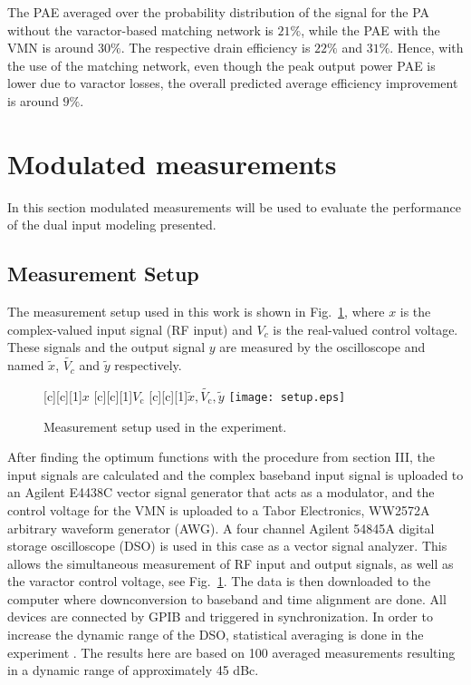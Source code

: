 \documentclass[10pt,journal]{IEEEtran}
\begin{document}
The PAE averaged over the probability distribution of the signal for the PA without the varactor-based matching network is $21\%$, while the PAE with the
VMN is around $30\%$. The respective drain efficiency is $22\%$ and
$31\%$. Hence, with the use of the matching network, even though the peak
output power PAE is lower due to varactor losses, the overall predicted average efficiency improvement is around $9\%$.

\section{Modulated measurements}
In this section modulated measurements will be used to evaluate the performance of the dual input modeling presented.

\subsection{Measurement Setup}
The measurement setup used in this work is shown in Fig.~\ref{setup}, where $x$ is the complex-valued input signal (RF input) and $V_c$ is the real-valued control voltage. These signals and the output signal $y$ are measured by the oscilloscope and named $\tilde{x}$, $\tilde{V_c}$ and $\tilde{y}$ respectively.

\begin{figure}
\centering {}[c][c][1]{$x$}
[c][c][1]{$V_\text{c}$}
[c][c][1]{$\tilde{x},\tilde{V_\text{c}},\tilde{y}$}
\texttt{[image: setup.eps]}
\caption{Measurement setup used in the experiment.} \label{setup}
\end{figure}

After finding the optimum functions with the procedure from section III, the input signals are calculated and the complex baseband input signal is uploaded to an Agilent E4438C vector signal generator that acts as a modulator, and the control voltage for the VMN is uploaded to a Tabor Electronics, WW2572A arbitrary waveform generator (AWG). A four channel Agilent 54845A digital storage oscilloscope (DSO) is used in this case as a vector signal analyzer. This allows the simultaneous measurement of RF input and output signals, as well  as the varactor control voltage, see Fig.~\ref{setup}. The data is then downloaded to the  computer where downconversion to baseband and time alignment are done. All devices are connected by GPIB and triggered in synchronization. In order to increase the dynamic range  of the DSO, statistical averaging is done in the experiment  \cite{fager}. The results here  are based on 100 averaged measurements resulting in a dynamic range of approximately 45 dBc.
\end{document}
